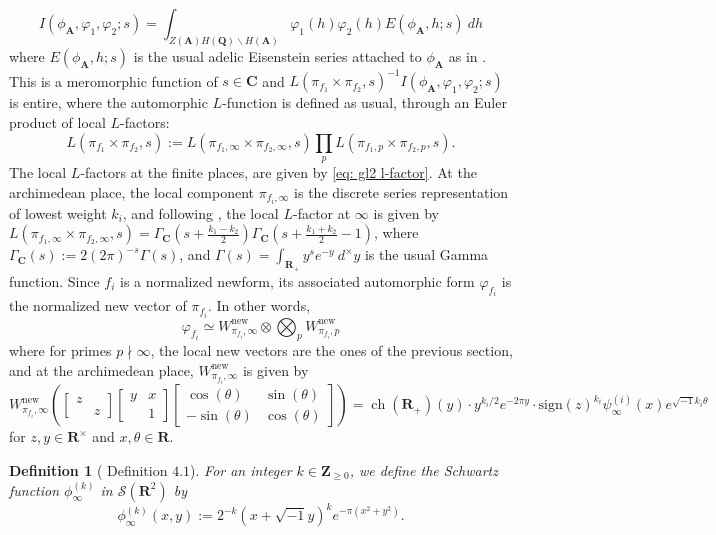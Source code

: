 \documentclass{amsart}
\theoremstyle{plain}
\theoremstyle{plain}
\newtheorem{defn}[thm]{Definition}
\theoremstyle{remark}
\DeclareMathOperator{\ch}{ch}
\begin{document}
$$I(\phi_\mathbf{A},\varphi_1,\varphi_2;s)=\int_{Z(\mathbf{A})H(\mathbf{Q})\backslash H(\mathbf{A})}\varphi_1(h)\varphi_2(h)E(\phi_\mathbf
A,h;s)\ dh$$
where $E(\phi_\mathbf
A,h;s)$ is the usual adelic Eisenstein series attached to $\phi_\mathbf{A}$ as in \cite{automorphic_on_GL}. This is a meromorphic function of $s\in\mathbf
C$ and $L(\pi_{f_1}\times\pi_{f_2},s)^{-1}I(\phi_\mathbf{A},\varphi_1,\varphi_2;s)$ is entire, where the automorphic $L$-function is defined as usual, through an Euler product of local $L$-factors:
$$L(\pi_{f_1}\times\pi_{f_2},s):=L(\pi_{f_1,\infty}\times\pi_{f_2,\infty},s)\prod_{p}L(\pi_{f_1,p}\times\pi_{f_2,p},s).$$
The local $L$-factors at the finite places, are given by \eqref{eq: gl2 l-factor}. At the archimedean place, the local component $\pi_{f_i,\infty}$ is the discrete series representation of lowest weight $k_i$, and following \cite{chen2020primitive}, the local $L$-factor at $\infty$ is given by $L(\pi_{f_1,\infty}\times\pi_{f_2,\infty},s)=\Gamma_\mathbf{C}(s+\tfrac{k_1-k_2}{2})\Gamma_\mathbf{C}(s+\tfrac{k_1+k_2}{2}-1)$, where $\Gamma_\mathbf{C}(s):=2(2\pi)^{-s}\Gamma(s)$, and $\Gamma(s)=\int_{\mathbf{R}_+}y^se^{-y}\ d^\times y$ is the usual Gamma function. Since $f_i$ is a normalized newform, its associated automorphic form $\varphi_{f_i}$ is the normalized new vector of $\pi_{f_i}$. In other words,
$$\varphi_{f_i}\simeq W_{\pi_{f_i},\infty}^\mathrm{new}\otimes \bigotimes_{p}W_{\pi_{f_i},p}^\mathrm{new}$$
where for primes $p\nmid\infty$, the local new vectors are the ones of the previous section, and at the archimedean place, $W_{\pi_{f_i},\infty}^\mathrm{new}$ is given by
$$W_{\pi_{f_i},\infty}^\mathrm{new}\left(\left[\begin{smallmatrix}
    z & \\
    & z
\end{smallmatrix}\right]\left[\begin{smallmatrix}
    y & x \\
    & 1
\end{smallmatrix}\right]\left[\begin{smallmatrix}
    \cos(\theta) & \sin(\theta)\\
    -\sin(\theta) & \cos(\theta)
\end{smallmatrix}\right]\right)=\ch(\mathbf{R}_+)(y)\cdot y^{k_i/2}e^{-2\pi y}\cdot \mathrm{sign}(z)^{k_i}\psi^{(i)}_\infty(x)e^{\sqrt{-1} k_i\theta}$$
for $z,y\in\mathbf{R}^\times$ and $x,\theta\in\mathbf{R}$.
\begin{defn}[\cite{chen2020primitive} Definition $4.1$]
   For an integer $k\in\mathbf{Z}_{\geq 0}$, we define the Schwartz function $\phi_\infty^{(k)}$ in $\mathcal{S}(\mathbf{R}^2)$ by 
$$\phi_\infty^{(k)}(x,y):=2^{-k}(x+\sqrt{-1}y)^ke^{-\pi(x^2+y^2)}.$$
\end{defn}
\end{document}
